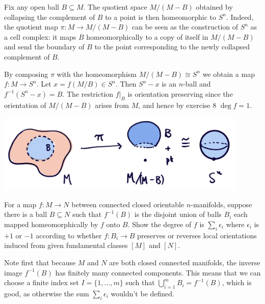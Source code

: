 \begin{homework}[e]
\begin{prf}
    Fix any open ball $B \subseteq M$. The quotient space $M/(M-B)$ obtained by collapsing the complement of $B$ to a point is then homeomorphic to $S^n$. Indeed, the quotient map $\pi:M \to M/(M-B)$ can be seen as the construction of $S^n$ as a cell complex: it maps $B$ homeomorphically to a copy of itself in $M/(M-B)$ and send the boundary of $B$ to the point corresponding to the newly collapsed complement of $B$. 
    
    By composing $\pi$ with the homeomorphism $M/(M - B)\cong S^n$ we obtain a map $f:M\to S^n$. Let $x = f(M/B)\in S^n$. Then $S^n - x$ is an $n$-ball and $f^{-1}(S^n - x) = B$. The restriction $f|_{B}$ is orientation preserving since the orientation of $M/(M - B)$ arises from $M$, and hence by exercise 8 $\deg f = 1$.
    \begin{center}
      \includegraphics[width=12cm]{figures/hwk11-fig3.png}
      \label{fig:prob17-3}
    \end{center}
  \end{prf}

   For a map $f:M\to N$ between connected closed orientable $n$-manifolds, suppose there is a ball $B \subseteq N$ such that $f^{-1}(B)$ is the disjoint union of balls $B_i$ each mapped homeomorphically by $f$ onto $B$. Show the degree of $f$ is $\sum_i \epsilon_i$ where $\epsilon_i$ is $+1$ or $-1$ according to whether $f:B_i\to B$ preserves or reverses local orientations induced from given fundamental classes $[M]$ and $[N]$.
  \begin{prf}
    Note first that because $M$ and $N$ are both closed connected manifolds, the inverse image $f^{-1}(B)$ has finitely many connected components. This means that we can choose a finite index set $I = \{1,...,m\}$ such that $\bigcup_{i=1}^m B_i = f^{-1}(B)$, which is good, as otherwise the sum $\sum_i \epsilon_i$ wouldn't be defined.


\end{prf}
\end{homework}
